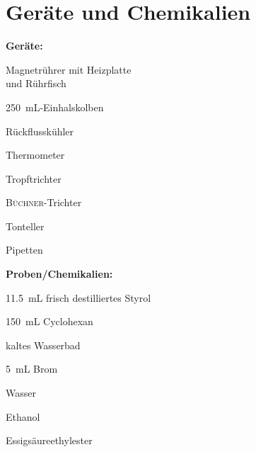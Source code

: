 \section{Geräte und Chemikalien}
\label{sec:geraete}

\textbf{Geräte:}
\begin{itemize}
	\begin{minipage}{0.45\textwidth}
		\item Magnetrührer mit Heizplatte \\ und Rührfisch
		\item \SI{250}{\milli \liter}-Einhalskolben
		\item Rückflusskühler
		\item Thermometer
	\end{minipage}
	\begin{minipage}{0.45\textwidth}
		\item Tropftrichter
		\item \textsc{Büchner}-Trichter
		\item Tonteller
		\item Pipetten
	\end{minipage}
\end{itemize}

\textbf{Proben/Chemikalien:}
\begin{itemize}
	\begin{minipage}{0.45 \textwidth}
		\item \SI{11,5}{\milli \liter} frisch destilliertes Styrol
		\item \SI{150}{\milli \liter} Cyclohexan
		\item kaltes Wasserbad
		\item \SI{5}{\milli \liter} Brom
	\end{minipage}
\begin{minipage}{0.45 \textwidth}
	\item Wasser
	\item Ethanol
	\item Essigsäureethylester
\end{minipage}
\end{itemize}



